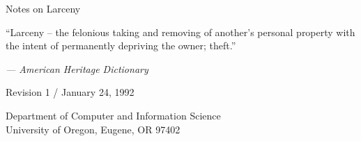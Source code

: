 \pagestyle{empty}


\vspace{.5in}
\centerline{\Huge Notes on Larceny}
\vspace{1in}

{
\noindent ``Larceny -- the felonious taking and removing of another's personal
property with the intent of permanently depriving the owner; theft.''
}

\vspace{0.4in}
{
\em
\noindent --- American Heritage Dictionary
}

\vspace{1in}
\centerline{Revision 1 / January 24, 1992}
\vspace{3in}
\begin{center}
Department of Computer and Information Science \\
University of Oregon, Eugene, OR 97402
\end{center}

